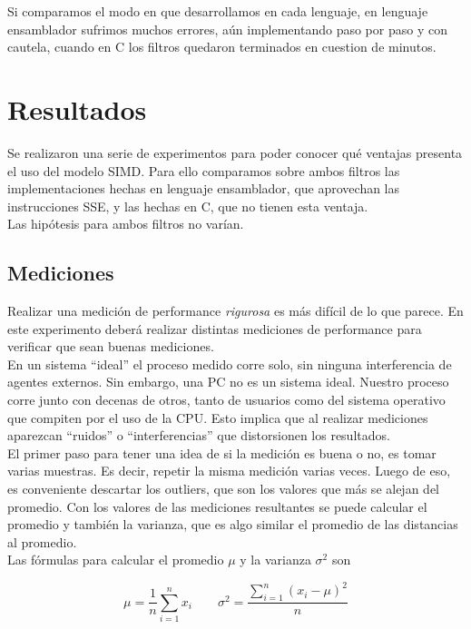 \documentclass[10pt,a4paper,spanish]{article}
\begin{document}
Si comparamos el modo en que desarrollamos en cada lenguaje, en lenguaje ensamblador sufrimos muchos errores, aún implementando paso por paso y con cautela, cuando en C los filtros quedaron terminados en cuestion de minutos.

\section{Resultados}

Se realizaron una serie de experimentos para poder conocer qué ventajas presenta el uso del modelo SIMD. Para ello comparamos sobre ambos filtros las implementaciones hechas en lenguaje ensamblador, que aprovechan las instrucciones SSE, y las hechas en C, que no tienen esta ventaja. \\

Las hipótesis para ambos filtros no varían.

\subsection{Mediciones}

Realizar una medición de performance \emph{rigurosa} es más difícil de lo que parece. En este experimento deberá realizar distintas mediciones de performance para verificar que sean buenas mediciones. \\

En un sistema ``ideal'' el proceso medido corre solo, sin ninguna interferencia de agentes externos. Sin embargo, una PC no es un sistema ideal. Nuestro proceso corre junto con decenas de otros, tanto de usuarios como del sistema operativo que compiten por el uso de la CPU. Esto implica que al realizar mediciones aparezcan ``ruidos'' o ``interferencias'' que distorsionen los resultados. \\

El primer paso para tener una idea de si la medición es buena o no, es tomar varias muestras. Es decir, repetir la misma medición varias veces. Luego de eso, es conveniente descartar los outliers, que son los valores que más se alejan del promedio. Con los valores de las mediciones resultantes se puede calcular el promedio y también la varianza, que es algo similar el promedio de las distancias al promedio. \\

Las fórmulas para calcular el promedio $\mu$ y la varianza $\sigma^2$ son

$$
\mu = \frac{1}{n}\sum_{i=1}^{n} x_i \qquad \sigma^2 = \frac{\displaystyle\sum_{i=1}^{n}(x_i - \mu)^2} {n}
$$
\end{document}
